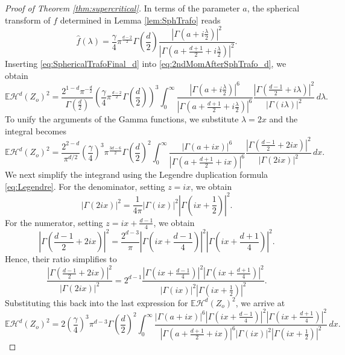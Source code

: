 \documentclass[11pt,a4paper]{article}
\theoremstyle{plain}
\theoremstyle{definition}
\theoremstyle{remark}
\def\EE{\mathbb{E}}
\def\cH{\mathcal{H}}
\begin{document}
\begin{proof}[Proof of Theorem \ref{thm:supercritical}]
In terms of the parameter $a$, the spherical transform of $f$ determined in Lemma \ref{lem:SphTrafo} reads
\begin{equation}\label{eq:SphericalTrafoFinal_d}
	\widehat{f}(\lambda) = \frac{\gamma}{4} \pi^{\frac{d-2}{2}} \Gamma\left(\frac{d}{2}\right)
	\frac{\left| \Gamma\left(a + i\frac{\lambda}{2}\right) \right|^2}{
		\left| \Gamma\left(a + \frac{d+1}{2} + i\frac{\lambda}{2}\right) \right|^2}.    
\end{equation}
Inserting \eqref{eq:SphericalTrafoFinal_d} into \eqref{eq:2ndMomAfterSphTrafo_d}, we obtain 
\begin{equation}\label{eq:SecondMomentIntermediate_d}
	\EE\cH^d(Z_o)^2
	= \frac{2^{1-d} \pi^{-\frac{d}{2}}}{\Gamma\left(\frac{d}{2}\right)} \left( \frac{\gamma}{4} \pi^{\frac{d-2}{2}} \Gamma\left(\frac{d}{2}\right) \right)^3
	\int_0^\infty
	\frac{\left| \Gamma\left(a + i\frac{\lambda}{2}\right) \right|^6}{
		\left| \Gamma\left(a + \frac{d+1}{2} + i\frac{\lambda}{2}\right) \right|^6}
	\frac{\left| \Gamma\left(\frac{d-1}{2} + i\lambda\right) \right|^2}{\left| \Gamma(i\lambda) \right|^2}
	\, d\lambda.
\end{equation}
To unify the arguments of the Gamma functions, we substitute $\lambda = 2x$ and the integral becomes
\[
\EE\cH^d(Z_o)^2
= \frac{2^{2-d}}{\pi^{d/2}} \left( \frac{\gamma}{4} \right)^3 \pi^{\frac{3d-6}{2}} \Gamma\left(\frac{d}{2}\right)^2
\int_0^\infty
\frac{\left| \Gamma(a + ix) \right|^6}{
	\left| \Gamma\left(a + \frac{d+1}{2} + ix\right) \right|^6}
\frac{\left| \Gamma\left(\frac{d-1}{2} + 2ix\right) \right|^2}{\left| \Gamma(2ix) \right|^2}
\, dx.
\]
We next simplify the integrand using the Legendre duplication formula \eqref{eq:Legendre}. For the denominator, setting $z=ix$, we obtain
\[
|\Gamma(2ix)|^2 = \frac{1}{4\pi} |\Gamma(ix)|^2 \left|\Gamma\left(ix+\frac{1}{2}\right)\right|^2.
\]
For the numerator, setting $z=ix+\frac{d-1}{4}$, we obtain
\[
\left|\Gamma\left(\frac{d-1}{2}+2ix\right)\right|^2
= \frac{2^{d-3}}{\pi} \left|\Gamma\left(ix+\frac{d-1}{4}\right)\right|^2 \left|\Gamma\left(ix+\frac{d+1}{4}\right)\right|^2.
\]
Hence, their ratio simplifies to
\[
\frac{\left| \Gamma\left(\frac{d-1}{2} + 2ix\right) \right|^2}{\left| \Gamma(2ix) \right|^2}
= 2^{d-1} \frac{\left| \Gamma\left(ix+\frac{d-1}{4}\right) \right|^2 \left| \Gamma\left(ix+\frac{d+1}{4}\right) \right|^2}{\left| \Gamma(ix) \right|^2 \left| \Gamma\left(ix+\frac{1}{2}\right) \right|^2}.
\]
Substituting this back into the last expression for $\EE\cH^d(Z_o)^2$, we arrive at
\[
\EE\cH^d(Z_o)^2
= 2 \left( \frac{\gamma}{4} \right)^3 \pi^{d-3} \Gamma\left(\frac{d}{2}\right)^2
\int_0^\infty
\frac{\left| \Gamma(a + ix) \right|^6 \left| \Gamma\left(ix+\frac{d-1}{4}\right) \right|^2 \left| \Gamma\left(ix+\frac{d+1}{4}\right) \right|^2}{
	\left| \Gamma\left(a + \frac{d+1}{2} + ix\right) \right|^6 \left| \Gamma(ix) \right|^2 \left| \Gamma\left(ix+\frac{1}{2}\right) \right|^2}
\, dx.
\]


\end{proof}
\end{document}
